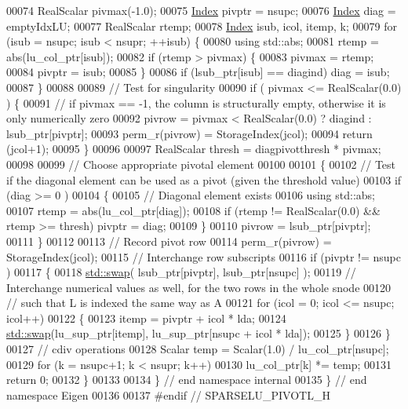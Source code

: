 \begin{DoxyCode}
00074   RealScalar pivmax(-1.0);
00075   \hyperlink{namespace_eigen_a62e77e0933482dafde8fe197d9a2cfde}{Index} pivptr = nsupc; 
00076   \hyperlink{namespace_eigen_a62e77e0933482dafde8fe197d9a2cfde}{Index} diag = emptyIdxLU; 
00077   RealScalar rtemp;
00078   \hyperlink{namespace_eigen_a62e77e0933482dafde8fe197d9a2cfde}{Index} isub, icol, itemp, k; 
00079   \textcolor{keywordflow}{for} (isub = nsupc; isub < nsupr; ++isub) \{
00080     \textcolor{keyword}{using} std::abs;
00081     rtemp = abs(lu\_col\_ptr[isub]);
00082     \textcolor{keywordflow}{if} (rtemp > pivmax) \{
00083       pivmax = rtemp; 
00084       pivptr = isub;
00085     \} 
00086     \textcolor{keywordflow}{if} (lsub\_ptr[isub] == diagind) diag = isub;
00087   \}
00088   
00089   \textcolor{comment}{// Test for singularity}
00090   \textcolor{keywordflow}{if} ( pivmax <= RealScalar(0.0) ) \{
00091     \textcolor{comment}{// if pivmax == -1, the column is structurally empty, otherwise it is only numerically zero}
00092     pivrow = pivmax < RealScalar(0.0) ? diagind : lsub\_ptr[pivptr];
00093     perm\_r(pivrow) = StorageIndex(jcol);
00094     \textcolor{keywordflow}{return} (jcol+1);
00095   \}
00096   
00097   RealScalar thresh = diagpivotthresh * pivmax; 
00098   
00099   \textcolor{comment}{// Choose appropriate pivotal element }
00100   
00101   \{
00102     \textcolor{comment}{// Test if the diagonal element can be used as a pivot (given the threshold value)}
00103     \textcolor{keywordflow}{if} (diag >= 0 ) 
00104     \{
00105       \textcolor{comment}{// Diagonal element exists}
00106       \textcolor{keyword}{using} std::abs;
00107       rtemp = abs(lu\_col\_ptr[diag]);
00108       \textcolor{keywordflow}{if} (rtemp != RealScalar(0.0) && rtemp >= thresh) pivptr = diag;
00109     \}
00110     pivrow = lsub\_ptr[pivptr];
00111   \}
00112   
00113   \textcolor{comment}{// Record pivot row}
00114   perm\_r(pivrow) = StorageIndex(jcol);
00115   \textcolor{comment}{// Interchange row subscripts}
00116   \textcolor{keywordflow}{if} (pivptr != nsupc )
00117   \{
00118     \hyperlink{endian_8c_a3ca5ecd34b04d6a243c054ac3a57f68d}{std::swap}( lsub\_ptr[pivptr], lsub\_ptr[nsupc] );
00119     \textcolor{comment}{// Interchange numerical values as well, for the two rows in the whole snode}
00120     \textcolor{comment}{// such that L is indexed the same way as A}
00121     \textcolor{keywordflow}{for} (icol = 0; icol <= nsupc; icol++)
00122     \{
00123       itemp = pivptr + icol * lda; 
00124       \hyperlink{endian_8c_a3ca5ecd34b04d6a243c054ac3a57f68d}{std::swap}(lu\_sup\_ptr[itemp], lu\_sup\_ptr[nsupc + icol * lda]);
00125     \}
00126   \}
00127   \textcolor{comment}{// cdiv operations}
00128   Scalar temp = Scalar(1.0) / lu\_col\_ptr[nsupc];
00129   \textcolor{keywordflow}{for} (k = nsupc+1; k < nsupr; k++)
00130     lu\_col\_ptr[k] *= temp; 
00131   \textcolor{keywordflow}{return} 0;
00132 \}
00133 
00134 \} \textcolor{comment}{// end namespace internal}
00135 \} \textcolor{comment}{// end namespace Eigen}
00136 
00137 \textcolor{preprocessor}{#endif // SPARSELU\_PIVOTL\_H}
\end{DoxyCode}
